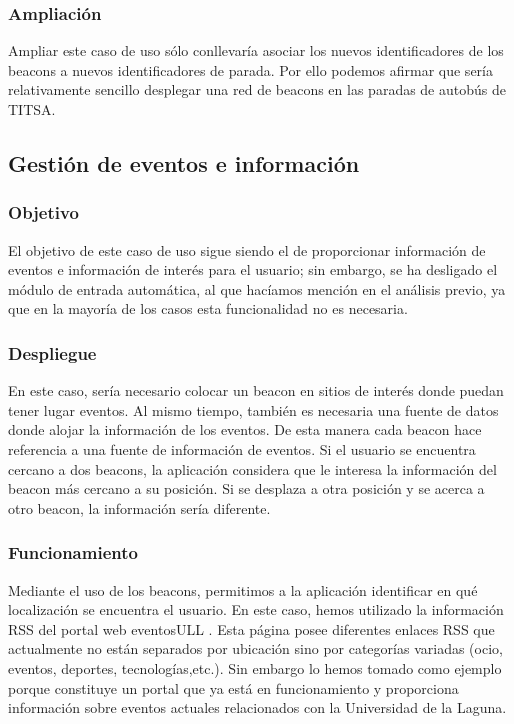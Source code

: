 \subsubsection{Ampliación}

Ampliar este caso de uso sólo conllevaría asociar los nuevos identificadores de los beacons a nuevos identificadores de parada. Por ello podemos afirmar que sería relativamente sencillo desplegar una red de beacons en las paradas de autobús de TITSA. 


\subsection{Gestión de eventos e información}

\subsubsection{Objetivo}

El objetivo de este caso de uso sigue siendo el de proporcionar información de eventos e información de interés para el usuario; sin embargo, se ha desligado el módulo de entrada automática, al que hacíamos mención en el análisis previo, ya que en la mayoría de los casos esta funcionalidad no es necesaria.  


\subsubsection{Despliegue}


En este caso, sería necesario colocar un beacon en sitios de interés donde puedan tener lugar eventos. Al mismo tiempo, también es necesaria una fuente de datos donde alojar la información de los eventos. De esta manera cada beacon hace referencia a una fuente de información de eventos. Si el usuario se encuentra cercano a dos beacons, la aplicación considera que le interesa la información del beacon más cercano a su posición. Si se desplaza a otra posición y se acerca a otro beacon, la información sería diferente.

\subsubsection{Funcionamiento}


Mediante el uso de los beacons, permitimos a la aplicación identificar en qué localización se encuentra el usuario. En este caso, hemos utilizado la información RSS del portal web eventosULL \cite{URL::eventsull}. Esta página posee diferentes enlaces RSS que actualmente no están separados por ubicación sino por categorías variadas (ocio, eventos, deportes, tecnologías,etc.). Sin embargo lo hemos tomado como ejemplo porque constituye un portal que ya está en funcionamiento y proporciona información sobre eventos actuales relacionados con la Universidad de la Laguna. 


